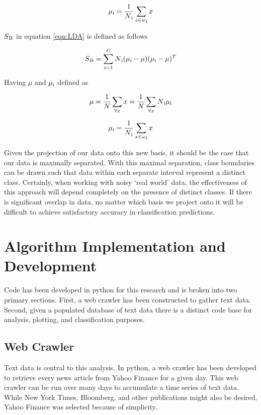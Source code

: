 \documentclass{article}
\begin{document}
\begin{equation}
\mu\textsubscript{i} = \frac{1}{N\textsubscript{i}}\sum\limits_{z \in w\textsubscript{i}} x
\end{equation}


$S\textsubscript{B}$ in equation \ref{eqn:LDA} is defined as follows

\begin{equation}
S\textsubscript{B} = \sum\limits_{i=1}^{C} N\textsubscript{i}(\mu\textsubscript{i}-\mu)(\mu\textsubscript{i}-\mu)^T
\end{equation}

Having $\mu$ and $\mu\textsubscript{i}$ defined as

\begin{equation}
\mu = \frac{1}{N}\sum\limits_{\forall x}{ } x = \frac{1}{N}\sum\limits_{\forall x} N\textsubscript{i}\mu\textsubscript{i}
\end{equation}

\begin{equation}
\mu\textsubscript{i} = \frac{1}{N\textsubscript{i}}\sum\limits_{x \in \omega \textsubscript{i}} x
\end{equation}


Given the projection of our data onto this new basis, it should be the case that our data is maximally separated.  With this maximal separation, class boundaries can be drawn such that data within each separate interval represent a distinct class.  Certainly, when working with noisy `real world' data, the effectiveness of this approach will depend completely on the presence of distinct classes.  If there is significant overlap in data, no matter which basis we project onto it will be difficult to achieve satisfactory accuracy in classification predictions.


\section{Algorithm Implementation and Development}

Code has been developed in python for this research and is broken into two primary sections.  First, a web crawler has been constructed to gather text data.  Second, given a populated database of text data there is a distinct code base for analysis, plotting, and classification purposes.


\subsection{Web Crawler}
Text data is central to this analysis.  In python, a web crawler has been developed to retrieve every news article from Yahoo Finance for a given day.  This web crawler can be run over many days to accumulate a time series of text data.  While New York Times, Bloomberg, and other publications might also be desired, Yahoo Finance was selected because of simplicity.  
\end{document}
